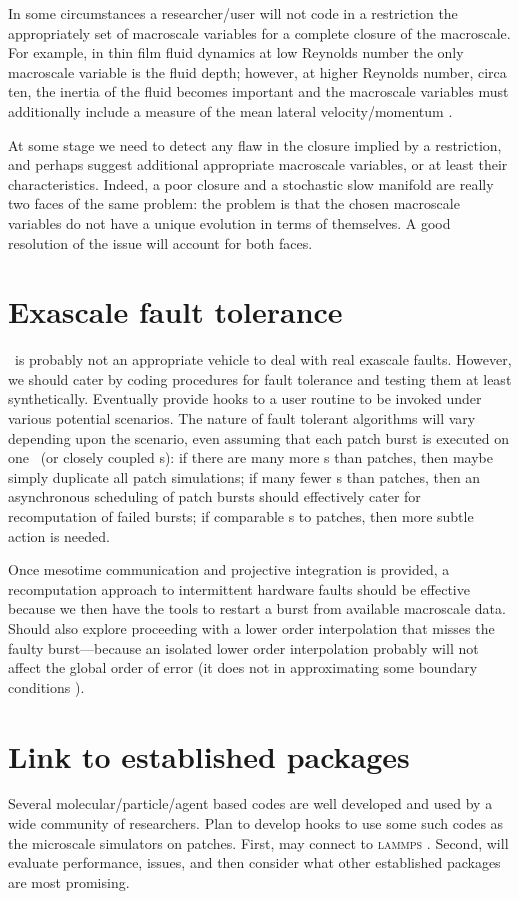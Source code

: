 In some circumstances a researcher\slash user will not code in a restriction the appropriately set of macroscale variables for a complete closure of the macroscale.
For example, in thin film fluid dynamics at low Reynolds number the only macroscale variable is the fluid depth; however, at higher Reynolds number, circa ten, the inertia of the fluid becomes important and the macroscale variables must additionally include a measure of the mean lateral velocity\slash momentum \citep[e.g.]{Roberts99b}.

At some stage we need to detect any flaw in the closure implied by a restriction, and perhaps suggest additional appropriate macroscale variables, or at least their characteristics.
Indeed, a poor closure and a stochastic slow manifold are really two faces of the same problem: the problem is that the chosen macroscale variables do not have a unique evolution in terms of themselves. 
A good resolution of the issue will account for both faces.




\section{Exascale fault tolerance}

\script\ is probably not an appropriate vehicle to deal with real exascale faults.  
However, we should cater by coding procedures for fault tolerance and testing them at least synthetically.
Eventually provide hooks to a user routine to be invoked under various potential scenarios.
The nature of fault tolerant algorithms will vary depending upon the scenario, even assuming that each patch burst is executed on one \cpu\ (or closely coupled \cpu{}s): if there are many more \cpu{}s than patches, then maybe simply duplicate all patch simulations;  if many fewer \cpu{}s than patches, then an asynchronous scheduling of patch bursts should effectively cater for recomputation of failed bursts; if comparable \cpu{}s to patches, then more subtle action is needed.

Once mesotime communication and projective integration is provided, a recomputation approach to intermittent hardware faults should be effective because we then have the tools to restart a burst from available macroscale data.
Should also explore proceeding with a lower order interpolation that misses the faulty burst---because an isolated lower order interpolation probably will not affect the global order of error (it does not in approximating some boundary conditions \citep{Gustafsson1975, Svard2006}).




\section{Link to established packages}

Several molecular\slash particle\slash agent based codes are well developed and used by a wide community of researchers.  
Plan to develop hooks to use some such codes as the microscale simulators on patches.
First, may connect to \textsc{lammps} \cite[]{LAMMPS}.
Second, will evaluate performance, issues, and then consider what other established packages are most promising.

